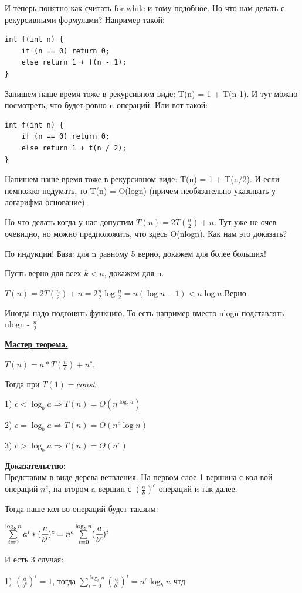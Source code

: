 \documentclass{article}
\newcommand{\deff}[1]{\underline{\textbf{#1}}}
\newcommand{\prooff}[1]{\textbf{\underline{Доказательство:}} \\ }
\begin{document}
И теперь понятно как считать for,while и тому подобное. Но что нам делать с рекурсивными формулами? Например такой:
\begin{lstlisting}[mathescape]
int f(int n) {
    if (n == 0) return 0;
    else return 1 + f(n - 1);
}
\end{lstlisting}

Запишем наше время тоже в рекурсивном виде: T(n) = 1 + T(n-1). И тут можно посмотреть, что будет ровно n операций. Или вот такой:

\begin{lstlisting}[mathescape]
int f(int n) {
    if (n == 0) return 0;
    else return 1 + f(n / 2);
}
\end{lstlisting}
Напишем наше время тоже в рекурсивном виде: T(n) = 1 + T(n/2). 
И если немножко подумать, то T(n) = O(logn) (причем необязательно указывать у логарифма основание).

Но что делать когда у нас допустим $T(n)=2T(\frac{n}{2})+n$. Тут уже не очев очевидно, но можно предположить, что здесь O(nlogn). Как нам это доказать?

По индукции! База: для n равному 5 верно, докажем для более больших!

Пусть верно для всех $k<n$, докажем для n.

$T(n) = 2T(\frac{n}{2})+n=2\frac{n}{2}\log\frac{n}{2} =n(\log n-1)<n\log n$.Верно

Иногда надо подгонять функцию. То есть например вместо nlogn подставлять nlogn - $\frac{n}{2}$

\deff{Мастер теорема.}

$T(n)=a*T(\frac{n}{b}) + n^c$.

Тогда при $T(1)=const$:

1) $c<\log_{b}a \Rightarrow T(n) = O(n^{\log_ba})$

2) $c=\log_{b}a \Rightarrow T(n) = O(n^c\log n)$

3) $c>\log_{b}a \Rightarrow T(n) = O(n^c)$

\prooff{} Представим в виде дерева ветвления. На первом слое 1 вершина с кол-вой операций $n^c$, на втором a вершин с $(\frac{n}{b})^c$ операций и так далее.

 Тогда наше кол-во операций будет таквым:
 
 $\sum\limits_{i=0}^{\log_bn}a^i*(\cfrac{n}{b^i})^c =n^c \sum\limits_{i=0}^{\log_bn} (\cfrac{a}{b^c})^i  $

 И есть 3 случая:

 1) $(\frac{a}{b^c})^i=1$, тогда $\sum\limits_{i=0}^{\log_bn} (\frac{a}{b^c})^i =n^c\log_bn$ чтд.
\end{document}

